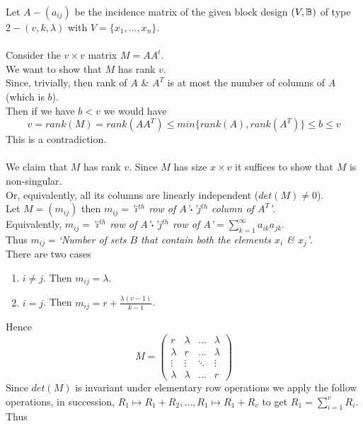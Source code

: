 \documentclass[11pt,a4paper]{article}
\begin{document}
Let $A-(a_{ij})$ be the incidence matrix of the given block design $(V,\mathbb{B})$ of type $2-(v,k,\lambda)$ with $V=\{x_1,\dots,x_n\}$.\\
\\
Consider the $v\times v$ matrix $M=AA^t$.\\
We want to show that $M$ has rank $v$.\\
Since, trivially, then rank of $A$ \& $A^T$ is at most the number of columns of $A$ (which is $b$).\\
Then if we have $b<v$ we would have
$$v=rank(M)=rank(AA^T)\leq min\{rank(A),rank(A^T)\}\leq b\leq v$$
This is a contradiction.\\
\\We claim that $M$ has rank $v$. Since $M$ has size $x\times v$ it suffices to show that $M$ is non-singular.\\
Or, equivalently, all its columns are linearly independent ($det(M)\neq0$).\\%
Let $M=(m_{ij})$ then $m_{ij}=$\textit{'$i^{th}$ row of $A$'}$\boldsymbol{\cdot}$\textit{'$j^{th}$ column of $A^T$'}.\\
Equivalently, $m_{ij}=$\textit{'$i^{th}$ row of $A$'}$\boldsymbol{\cdot}$\textit{'$j^{th}$ row of $A$'}$=\sum_{k=1}^\infty a_{ik}a_{jk}$.\\
Thus $m_{ij}=$\textit{`Number of sets $B$ that contain both the elements $x_i$ \& $x_j$'}.\\
There are two cases
\begin{enumerate}[label=\roman*)]
	\item $i\neq j$. Then $m_{ij}=\lambda$.
	\item $i=j$. Then $m_{ij}=r+\frac{\lambda(v-1)}{k-1}$.
\end{enumerate}
Hence
$$M=\begin{pmatrix}r&\lambda&\dots&\lambda\\\lambda&r&\dots&\lambda\\\vdots&\vdots&\ddots&\vdots\\\lambda&\lambda&\dots&r\end{pmatrix}$$
Since $det(M)$ is invariant under elementary row operations we apply the follow operations, in succession, $R_1\mapsto R_1+R_2,\dots,R_1\mapsto R_1+R_v$ to get $R_1=\sum_{i=1}^v R_i$. Thus
\end{document}
